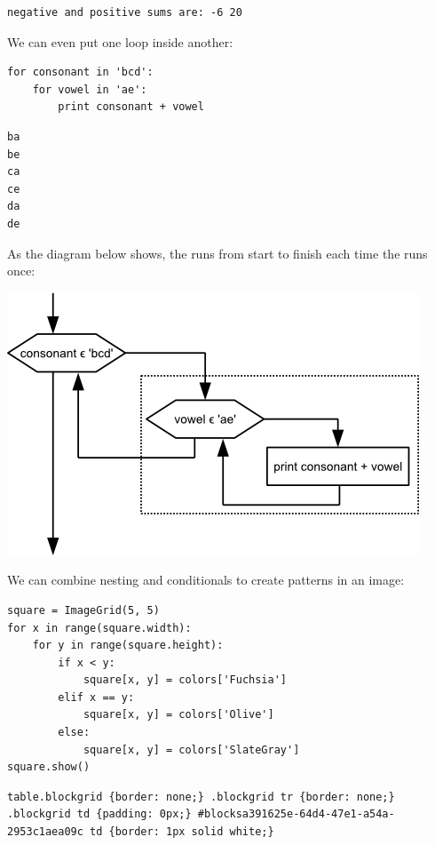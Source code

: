 \documentclass{book}
\begin{document}
\begin{verbatim}
negative and positive sums are: -6 20
\end{verbatim}

We can even put one loop inside another:

\begin{verbatim}
for consonant in 'bcd':
    for vowel in 'ae':
        print consonant + vowel
\end{verbatim}

\begin{verbatim}
ba
be
ca
ce
da
de
\end{verbatim}

As the diagram below shows, the  runs
from start to finish each time the 
runs once:

\includegraphics{novice/python/img/python-flowchart-nested-loops.png}

We can combine nesting and conditionals to create patterns in an image:

\begin{verbatim}
square = ImageGrid(5, 5)
for x in range(square.width):
    for y in range(square.height):
        if x < y:
            square[x, y] = colors['Fuchsia']
        elif x == y:
            square[x, y] = colors['Olive']
        else:
            square[x, y] = colors['SlateGray']
square.show()
\end{verbatim}

\begin{verbatim}
table.blockgrid {border: none;} .blockgrid tr {border: none;} .blockgrid td {padding: 0px;} #blocksa391625e-64d4-47e1-a54a-2953c1aea09c td {border: 1px solid white;}
\end{verbatim}
\end{document}
